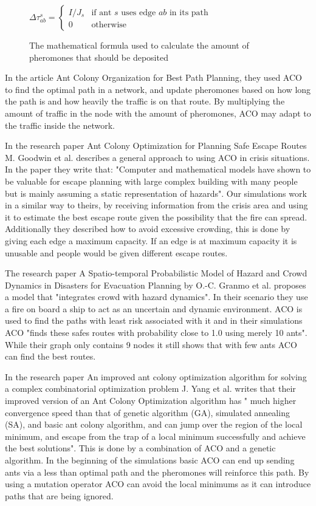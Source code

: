 \begin{figure}[h]
\centering
\begin{math}
\Delta \tau^{s}_{ab} =
\begin{cases}
I/J_s & \mbox{if ant }s\mbox{ uses edge }ab\mbox{ in its path} \\
0 & \mbox{otherwise}
\end{cases}
\end{math}
\caption{The mathematical formula used to calculate the amount of pheromones that should be deposited}
\label{fig:update}
\end{figure}

In the article Ant Colony Organization for Best Path Planning\cite{acobpp:2004}, they used ACO to find the optimal path in a network, and update pheromones based on how long the path is and how heavily the traffic is on that route. By multiplying the amount of traffic in the node with the amount of pheromones, ACO may adapt to the traffic inside the network.

In the research paper Ant Colony Optimization for Planning Safe Escape Routes \cite{acofpser} M. Goodwin et al. describes a general approach to using ACO in crisis situations. In the paper they write that: "Computer and mathematical models have shown to be valuable for escape planning with large complex building with many people but is mainly assuming a static representation of hazards". Our simulations work in a similar way to theirs, by receiving information from the crisis area and using it to estimate the best escape route given the possibility that the fire can spread. Additionally they described how to avoid excessive crowding, this is done by giving each edge a maximum capacity. If an edge is at maximum capacity it is unusable and people would be given different escape routes.

The research paper A Spatio-temporal Probabilistic Model of Hazard and Crowd Dynamics in Disasters for Evacuation Planning \cite{dbn} by O.-C. Granmo et al. proposes a model that "integrates crowd with hazard dynamics". In their scenario they use a fire on board a ship to act as an uncertain and dynamic environment.  ACO is used to find the paths with least risk associated with it and in their simulations ACO "finds these safes routes with probability close to 1.0 using merely 10 ants". While their graph only contains 9 nodes it still shows that with few ants ACO can find the best routes.  

In the research paper An improved ant colony optimization algorithm for solving a complex combinatorial optimization problem \cite{Yang2010653} J. Yang et al. writes that their improved version of an Ant Colony Optimization algorithm has " much higher convergence speed than that of genetic algorithm (GA), simulated annealing (SA), and basic ant colony algorithm, and can jump over the region of the local minimum, and escape from the trap of a local minimum successfully and achieve the best solutions". This is done by a combination of ACO and a genetic algorithm. In the beginning of the simulations basic ACO can end up sending ants via a less than optimal path and the pheromones will reinforce this path. By using a mutation operator ACO can avoid the local minimums as it can introduce paths that are being ignored.

